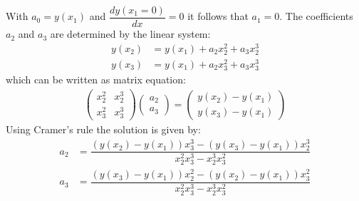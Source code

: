 With $a_0 = y(x_1)$ and $\dfrac{d y(x_1=0)}{d x} = 0$ it follows that $a_1 = 0$.
The coefficients $a_2$ and $a_3$ are determined by the linear system: 
\begin{align}
	y(x_2) &= y(x_1) + a_2 x_2^2 +  a_3 x_2^3 \\
	y(x_3) &= y(x_1) + a_2 x_3^2 +  a_3 x_3^3
\end{align}
which can be written as matrix equation:
\begin{align}
	\begin{pmatrix} x_2^2 & x_2^3 \\
					x_3^2 & x_3^3 
	\end{pmatrix}
	\begin{pmatrix}	a_2 \\ a_3
	\end{pmatrix}
	=
		\begin{pmatrix} y(x_2) - y(x_1) \\ y(x_3) - y(x_1)
	\end{pmatrix}
\end{align}
Using Cramer's rule the solution is given by:
\begin{align}
 a_2 &= \dfrac{(y(x_2) - y(x_1)) x_3^3 - (y(x_3) - y(x_1)) x_2^3}{x_2^2 x_3^3 - x_2^3 x_3^2} \\
 a_3 &= \dfrac{(y(x_3) - y(x_1)) x_2^2 - (y(x_2) - y(x_1)) x_3^2}{x_2^2 x_3^3 - x_2^3 x_3^2}
\end{align}



